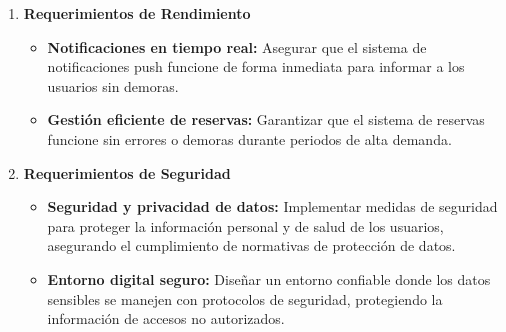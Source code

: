 \begin{enumerate}
\begin{itemize}
    \end{itemize}
    \item \textbf{Requerimientos de Rendimiento}
    \begin{itemize}
        \item \textbf{Notificaciones en tiempo real:} Asegurar que el sistema de notificaciones push funcione de forma inmediata para informar a los usuarios sin demoras.
        \item \textbf{Gestión eficiente de reservas:} Garantizar que el sistema de reservas funcione sin errores o demoras durante periodos de alta demanda.
    \end{itemize}
    \item \textbf{Requerimientos de Seguridad}
    \begin{itemize}
        \item \textbf{Seguridad y privacidad de datos:} Implementar medidas de seguridad para proteger la información personal y de salud de los usuarios, asegurando el cumplimiento de normativas de protección de datos.
        \item \textbf{Entorno digital seguro:} Diseñar un entorno confiable donde los datos sensibles se manejen con protocolos de seguridad, protegiendo la información de accesos no autorizados.
    \end{itemize}
\end{enumerate}